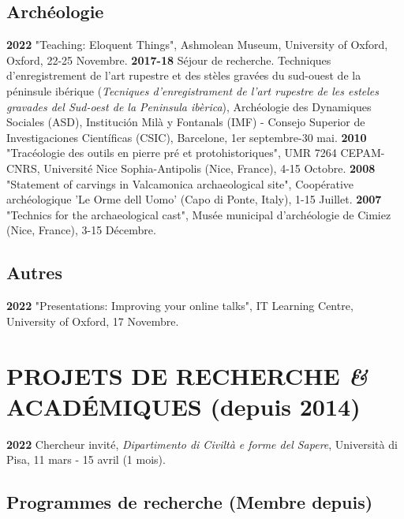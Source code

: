 \documentclass{article}
\begin{document}
\subsection*{Archéologie}

\textbf{2022 } "Teaching: Eloquent Things", Ashmolean Museum, University of Oxford, Oxford, 22-25 Novembre.
\smallbreak
\textbf{2017-18} Séjour de recherche. Techniques d'enregistrement de l'art rupestre et des stèles gravées du sud-ouest de la péninsule ibérique (\textit{Tecniques d'enregistrament de l'art rupestre de les esteles gravades del Sud-oest de la Peninsula ibèrica}), Archéologie des Dynamiques Sociales (ASD), Institución Milà y Fontanals (IMF) - Consejo Superior de Investigaciones Científicas (CSIC), Barcelone, 1er septembre-30 mai.
\smallbreak
\textbf{2010 } "Tracéologie des outils en pierre pré et protohistoriques", UMR 7264 CEPAM-CNRS, Universit\'{e} Nice Sophia-Antipolis (Nice, France), 4-15 Octobre.
\smallbreak
\textbf{2008 } "Statement of carvings in Valcamonica archaeological site", Coopérative archéologique 'Le Orme dell Uomo' (Capo di Ponte, Italy), 1-15 Juillet.
\smallbreak
\textbf{2007 } "Technics for the archaeological cast", Mus\'{e}e municipal d'arch\'{e}ologie de Cimiez (Nice, France), 3-15 Décembre.

\subsection*{Autres}

\textbf{2022 } "Presentations: Improving your online talks", IT Learning Centre, University of Oxford, 17 Novembre.
\smallbreak

\section{PROJETS DE RECHERCHE \textit{\&} ACADÉMIQUES (depuis 2014)}

\textbf{2022} Chercheur invité, \textit{Dipartimento di Civiltà e forme del Sapere}, Università di Pisa, 11 mars - 15 avril (1 mois).
\smallbreak

\subsection*{Programmes de recherche (Membre depuis)}
\end{document}
